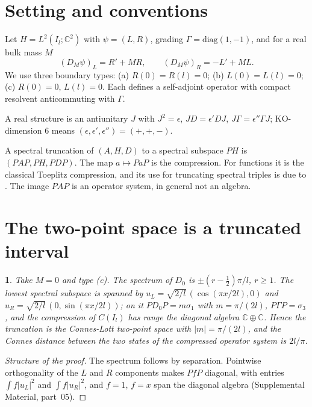 \documentclass[aps,prd,reprint,onecolumn,nofootinbib,amsmath,amssymb,floatfix]{revtex4-2}
\theoremstyle{plain}
\newcommand{\resultname}{}
\newtheorem*{resultenv}{\resultname}
\newenvironment{result}[1]{\renewcommand{\resultname}{#1}\begin{resultenv}}{\end{resultenv}}
\newcommand{\supp}[1]{Supplemental Material, part~#1}
\newcommand{\C}{\mathbb C}
\begin{document}
\section{Setting and conventions}

Let $H=L^2(I_l;\C^2)$ with $\psi=(L,R)$, grading $\Gamma=\mathrm{diag}(1,-1)$, and for a real bulk mass $M$
\begin{equation}
(D_M\psi)_L=R'+MR,\qquad (D_M\psi)_R=-L'+ML.
\end{equation}
We use three boundary types: (a) $R(0)=R(l)=0$; (b) $L(0)=L(l)=0$; (c) $R(0)=0$, $L(l)=0$. Each defines a self-adjoint operator with compact resolvent anticommuting with $\Gamma$.

A real structure is an antiunitary $J$ with $J^2=\epsilon$, $JD=\epsilon'DJ$, $J\Gamma=\epsilon''\Gamma J$; KO-dimension 6 means $(\epsilon,\epsilon',\epsilon'')=(+,+,-)$.

A spectral truncation of $(A,H,D)$ to a spectral subspace $PH$ is $(PAP,PH,PDP)$. The map $a\mapsto PaP$ is the compression. For functions it is the classical Toeplitz compression, and its use for truncating spectral triples is due to \cite{DLM2014,CvS2021}. The image $PAP$ is an operator system, in general not an algebra.

\section{The two-point space is a truncated interval}

\begin{result}{Theorem A}
Take $M=0$ and type (c). The spectrum of $D_0$ is $\pm(r-\tfrac12)\pi/l$, $r\ge1$. The lowest spectral subspace is spanned by $u_L=\sqrt{2/l}\,(\cos(\pi x/2l),0)$ and $u_R=\sqrt{2/l}\,(0,\sin(\pi x/2l))$; on it $PD_0P=m\sigma_1$ with $m=\pi/(2l)$, $P\Gamma P=\sigma_3$, and the compression of $C(I_l)$ has range the diagonal algebra $\C\oplus\C$. Hence the truncation is the Connes-Lott two-point space with $|m|=\pi/(2l)$, and the Connes distance between the two states of the compressed operator system is $2l/\pi$.
\end{result}

\begin{proof}[Structure of the proof]
The spectrum follows by separation. Pointwise orthogonality of the $L$ and $R$ components makes $PfP$ diagonal, with entries $\int f|u_L|^2$ and $\int f|u_R|^2$, and $f=1$, $f=x$ span the diagonal algebra (\supp{05}).
\end{proof}
\end{document}
